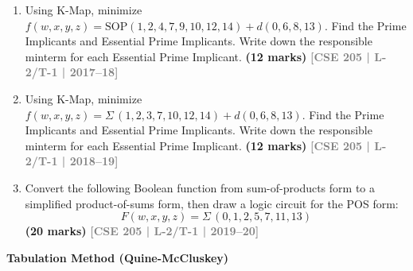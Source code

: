 \documentclass[12pt,a4paper]{article}
\newcommand{\yr}[1]{\hfill\textcolor{gray}{\small\textbf{[#1]}}}
\newcommand{\mk}[1]{\textcolor{orange!70!black}{\small\textbf{(#1 marks)}}}
\newcommand{\subtopic}[2]{%
  \vspace{10pt}
  \noindent\begin{tcolorbox}[colback=#1!8,colframe=#1,boxrule=0.6pt,arc=4pt,
    left=6pt,right=6pt,top=4pt,bottom=4pt]
    \small\bfseries\textcolor{#1}{#2}
  \end{tcolorbox}
  \vspace{2pt}
}
\begin{document}
\begin{enumerate}
\item Using K-Map, minimize $f(w,x,y,z) = \mathrm{SOP}(1,2,4,7,9,10,12,14) + d(0,6,8,13)$. Find the Prime Implicants and Essential Prime Implicants. Write down the responsible minterm for each Essential Prime Implicant.
\mk{12} \yr{CSE 205 | L-2/T-1 | 2017--18}

\item Using K-Map, minimize $f(w,x,y,z) = \Sigma\,(1,2,3,7,10,12,14) + d(0,6,8,13)$. Find the Prime Implicants and Essential Prime Implicants. Write down the responsible minterm for each Essential Prime Implicant.
\mk{12} \yr{CSE 205 | L-2/T-1 | 2018--19}


\item Convert the following Boolean function from sum-of-products form to a simplified product-of-sums form, then draw a logic circuit for the POS form:
\[ F(w,x,y,z) = \Sigma\,(0,1,2,5,7,11,13) \]
\mk{20} \yr{CSE 205 | L-2/T-1 | 2019--20}



\end{enumerate}

\subtopic{cC}{Tabulation Method (Quine-McCluskey)}
\label{sub:s3-tabulation}
\end{document}
